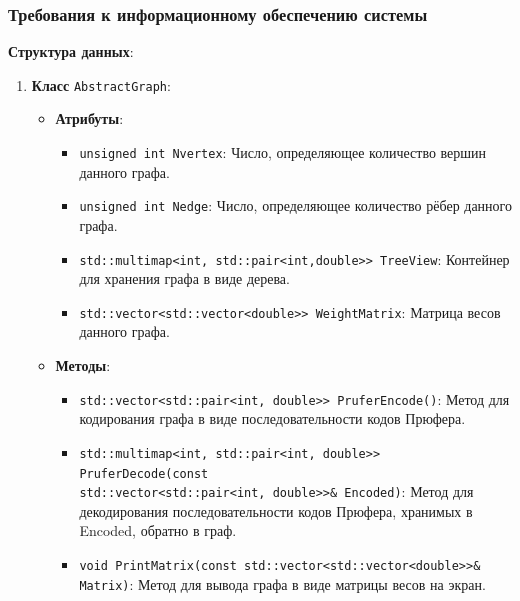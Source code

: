\documentclass[12pt,a4paper]{article}
\begin{document}
\subsubsection{Требования к информационному обеспечению системы}
\textbf{Структура данных}:
\begin{enumerate}
    \item \textbf{Класс} \texttt{AbstractGraph}:
        \begin{itemize}
            \item \textbf{Атрибуты}:
            \begin{itemize}
                \item \texttt{unsigned int Nvertex}: Число, определяющее количество вершин данного графа.
                \item \texttt{unsigned int Nedge}: Число, определяющее количество рёбер данного графа.
                \item \texttt{std::multimap<int, std::pair<int,double{>}{>} TreeView}: Контейнер для хранения графа в
                виде дерева.
                \item \texttt{std::vector<std::vector<double{>}{>} WeightMatrix}: Матрица весов данного графа.
            \end{itemize}

            \item \textbf{Методы}:
            \begin{itemize}
                \item \texttt{std::vector<std::pair<int, double{>}{>} PruferEncode()}: Метод для кодирования графа в виде
                последовательности кодов Прюфера.
                \item \texttt{std::multimap<int, std::pair<int, double{>}{>} PruferDecode(const \\ 
                std::vector<std::pair<int, double{>}{>}\& Encoded)}: 
                    Метод для декодирования последовательности кодов Прюфера, хранимых в Encoded, обратно в граф.
                \item \texttt{void PrintMatrix(const std::vector<std::vector<double{>}{>}\& Matrix)}: Метод для вывода
                графа в виде матрицы весов на экран.
            \end{itemize}
        \end{itemize}
    

\end{enumerate}
\end{document}

